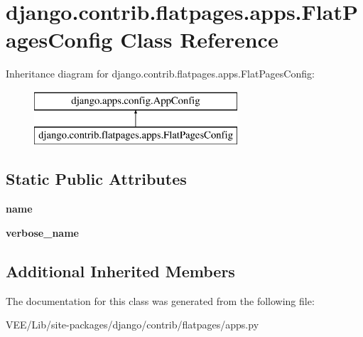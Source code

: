 \hypertarget{classdjango_1_1contrib_1_1flatpages_1_1apps_1_1_flat_pages_config}{}\section{django.\+contrib.\+flatpages.\+apps.\+Flat\+Pages\+Config Class Reference}
\label{classdjango_1_1contrib_1_1flatpages_1_1apps_1_1_flat_pages_config}
Inheritance diagram for django.\+contrib.\+flatpages.\+apps.\+Flat\+Pages\+Config\+:\begin{figure}[H]
\begin{center}
\leavevmode
\includegraphics[height=2.000000cm]{classdjango_1_1contrib_1_1flatpages_1_1apps_1_1_flat_pages_config}
\end{center}
\end{figure}
\subsection*{Static Public Attributes}
\begin{DoxyCompactItemize}
\item 
\mbox{\label{classdjango_1_1contrib_1_1flatpages_1_1apps_1_1_flat_pages_config_a0ad53ea468c74bd8bcd53e624daa26ea}} 
{\bfseries name}
\item 
\mbox{\label{classdjango_1_1contrib_1_1flatpages_1_1apps_1_1_flat_pages_config_a7322c2929950ff13c43af8adbc6279de}} 
{\bfseries verbose\+\_\+name}
\end{DoxyCompactItemize}
\subsection*{Additional Inherited Members}


The documentation for this class was generated from the following file\+:\begin{DoxyCompactItemize}
\item 
V\+E\+E/\+Lib/site-\/packages/django/contrib/flatpages/apps.\+py\end{DoxyCompactItemize}
